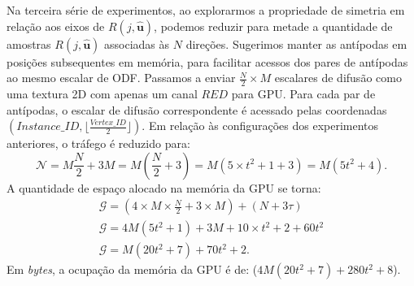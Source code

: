 Na terceira série de experimentos, ao explorarmos a propriedade de simetria em relação aos eixos de $R(j, \mathbf{\hat{u}})$, podemos reduzir para metade a quantidade de amostras $R(j, \mathbf{\hat{u}})$ associadas às $N$ direções. Sugerimos manter as antípodas em posições subsequentes em memória, para facilitar acessos dos pares de antípodas ao mesmo escalar de ODF. Passamos a enviar $\frac{N}{2} \times M$ escalares de difusão como uma textura 2D com apenas um canal $RED$ para GPU. Para cada par de antípodas, o escalar de difusão correspondente é acessado pelas coordenadas $(Instance\_ID, \lfloor \frac{Vertex\_ID}{2} \rfloor)$. Em relação às configurações dos experimentos anteriores, o tráfego é reduzido para:
\begin{equation}
\label{eq::mem_odfs_trafego_3.1}
    \mathscr{N} =  M \frac{N}{2} + 3 M = M (\frac{N}{2} +3) = M(5\times t^2 + 1 + 3) = M(5t^2 + 4).
\end{equation}
A quantidade de espaço alocado na memória da GPU se torna:
\begin{equation}
\label{eq::mem_odfs_ocupancia_3.1}
\begin{array}{l}
    \mathscr{G} =  (4\times M\times \frac{N}{2} + 3\times M) + (N + 3\tau) \\
    \mathscr{G} = 4M(5t^2+1) + 3M + 10\times t^2 + 2 + 60t^2 \\
    \mathscr{G} = M(20t^2 + 7) + 70t^2 + 2 .
    \end{array}
\end{equation}
Em \textit{bytes}, a ocupação da memória da GPU é de: ($4M(20t^2 + 7) + 280t^2 + 8$).

